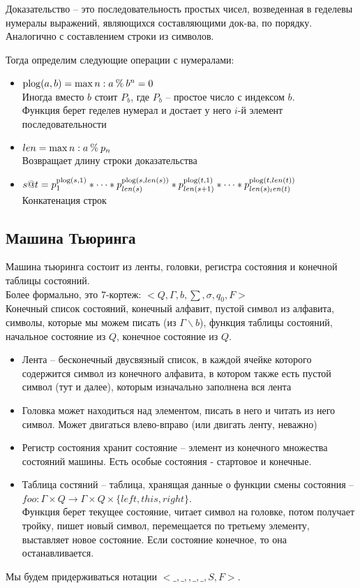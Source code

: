 Доказательство -- это последовательность простых чисел, возведенная
в геделевы нумералы выражений, являющихся составляющими док-ва, по
порядку. Аналогично с составлением строки из символов.

Тогда определим следующие операции с нумералами:
\begin{itemize}
\item $\operatorname{plog}(a, b) = \max n : a \mathbin{\%} b^n = 0$\\
Иногда вместо $b$ стоит $P_{b}$, где $P_{b}$ -- простое число с индексом $b$.\\
Функция берет геделев нумерал и достает у него $i$-й элемент последовательности
\item $len = \max n : a \mathbin{\%} p_n$\\
Возвращает длину строки доказательства
\item $s@t = p_1^{\operatorname{plog}(s, 1)} * \dots  * p_{len(s)}^{\operatorname{plog}(s, len(s))} *
p_{len(s+1)}^{\operatorname{plog}(t, 1)} * \dots  * p_{len(s)_len(t)}^{\operatorname{plog}(t, len(t))}$\\
Конкатенация строк
\end{itemize}
\subsection{Машина Тьюринга}
\label{sec-12-3}
Машина тьюринга состоит из ленты, головки, регистра состояния и конечной таблицы состояний.\\
Более формально, это 7-кортеж: $<Q, \Gamma, b, \sum, \sigma, q_0, F>$\\
Конечный список состояний, конечный алфавит, пустой символ из алфавита, символы, которые мы можем писать (из $\Gamma \backslash b$), функция таблицы состояний, начальное состояние из $Q$, конечное состояние из $Q$.
\begin{itemize}
\item Лента -- бесконечный двусвязный список, в каждой ячейке которого содержится символ из конечного алфавита, в котором также есть пустой символ (тут и далее), которым изначально заполнена вся лента
\item Головка может находиться над элементом, писать в него и читать из него символ. Может двигаться влево-вправо (или двигать ленту, неважно)
\item Регистр состояния хранит состояние -- элемент из конечного множества состояний машины. Есть особые состояния - стартовое и конечные.
\item Таблица состяний -- таблица, хранящая данные о функции смены состояния -- $foo: \Gamma \times Q \to \Gamma \times Q \times \{left, this, right\}$.\\
Функция берет текущее состояние, читает символ на головке, потом получает тройку, пишет новый символ, перемещается по третьему элементу, выставляет новое состояние. Если состояние конечное, то она останавливается.
\end{itemize}
Мы будем придерживаться нотации $<\_, \_,  , \_, \_, S, F>$.
